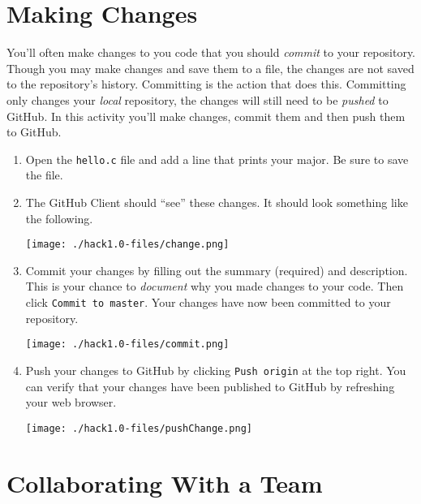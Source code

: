 \documentclass[12pt]{scrartcl}
\begin{document}
\section{Making Changes}

You'll often make changes to you code that you should \emph{commit} to
your repository.  Though you may make changes and save them to a file, 
the changes are not saved to the repository's history.  Committing is 
the action that does this.  Committing only changes your \emph{local}
repository, the changes will still need to be \emph{pushed} to GitHub.
In this activity you'll make changes, commit them and then push them
to GitHub.

\begin{enumerate}
  \item Open the \texttt{hello.c} file and add a line that
  prints your major.  Be sure to save the file.

  \item The GitHub Client should ``see'' these changes.  It should look
  something like the following. 
  \begin{center}
  \texttt{[image: ./hack1.0-files/change.png]}
  \end{center}

  \item Commit your changes by filling out the summary (required) and description.
  This is your chance to \emph{document} why you made changes to your code.
  Then click \texttt{Commit to master}.  Your changes have now
  been committed to your repository.  
  \begin{center}
  \texttt{[image: ./hack1.0-files/commit.png]}
  \end{center}
  
  \item Push your changes to GitHub by clicking \texttt{Push origin}
  at the top right.  You can verify that your changes have been published
  to GitHub by refreshing your web browser.
  \begin{center}
  \texttt{[image: ./hack1.0-files/pushChange.png]}
  \end{center}

\end{enumerate}

\section{Collaborating With a Team}
\end{document}
